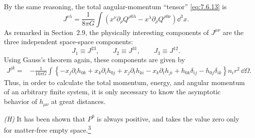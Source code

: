 By the same reasoning, the total angular-momentum ``tensor''
\eqref{eq:7.6.13} is
\[
  J^{\nu\lambda}
  =
  \frac{1}{8\pi G}\int
  \left(
    x^\nu\partial_\rho Q^{\rho0\lambda}
    -x^\lambda\partial_\rho Q^{\rho0\nu}
  \right)\dd^3x .
\]
As remarked in Section~2.9, the physically interesting components of
\(J^{\mu\nu}\) are the three independent space-space components:
\[
  J_1\equiv J^{23},
  \qquad
  J_2\equiv J^{31},
  \qquad
  J_3\equiv J^{12}.
\]
Using Gauss's theorem again, these components are given by
\begin{align}
  J^{jk}
  ={}&
  -\frac{1}{16\pi G}
  \int\left\{
    -x_j\partial_i h_{0k}
    +x_k\partial_i h_{0j}
    +x_j\partial_t h_{ki}
    -x_k\partial_t h_{ji}
    +h_{0k}\delta_{ij}
    -h_{0j}\delta_{ik}
  \right\}n_i r^2\,\dd\Omega .
  \tag{7.6.24}\label{eq:7.6.24}
\end{align}
Thus, in order to calculate the total momentum, energy, and angular momentum
of an arbitrary finite system, it is only necessary to know the asymptotic
behavior of \(h_{\mu\nu}\) at great distances.

\medskip
\noindent\textit{(H)} It has been shown that \(P^0\) is always positive,
and takes the value zero only for matter-free empty
space.\hyperref[ch7-ref-3]{\textsuperscript{3}}

